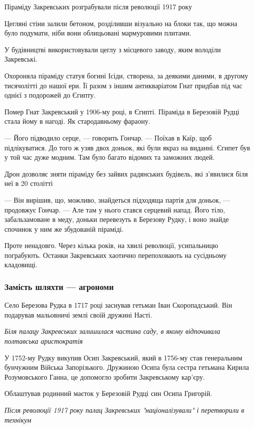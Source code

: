 Піраміду Закревських розграбували після революції 1917 року

Цегляні стіни залили бетоном, розділивши візуально на блоки так, що можна було
подумати, ніби вони облицьовані мармуровими плитами.

У будівництві використовували цеглу з місцевого заводу, яким володіли
Закревські.

Охороняла піраміду статуя богині Ісіди, створена, за деякими даними, в другому
тисячолітті до нашої ери. Її разом з іншим антикваріатом Гнат придбав під час
однієї з подорожей до Єгипту.

Помер Гнат Закревський у 1906-му році, в Єгипті. Піраміда в Березовій Рудці
стала йому в нагоді. Як стародавньому фараону.  

--- Його підводило серце, --- говорить Гончар. --- Поїхав в Каїр, щоб підлікуватися.
До того ж узяв двох доньок, які були якраз на виданні. Єгипет був у той час
дуже модним. Там було багато відомих та заможних людей. 

Дрон дозволяє зняти піраміду без зайвих радянських будівель, які з'явилися біля
неї в 20 столітті

---  Він вирішив, що, можливо, знайдеться підходяща партія для доньок, ---
продовжує Гончар. ---  Але там у нього стався серцевий напад. Його тіло,
забальзамоване в меду, доньки перевезуть в Березову Рудку, і воно знайде
спочинок у ним же збудованій піраміді.

Проте ненадовго. Через кілька років, на хвилі революції, усипальницю
пограбують. Останки Закревських хаотично перепоховають на сусідньому кладовищі.

\subsubsection{Замість шляхти --- агрономи}

Село Березова Рудка в 1717 році заснував гетьман Іван Скоропадський. Він
подарував мальовничі землі своїй дружині Насті.

\emph{Біля палацу Закревських залишилася частина саду, в якому відпочивала полтавська
аристократія}

У 1752-му Рудку викупив Осип Закревський, який в 1756-му став генеральним
бунчужним Війська Запорізького. Дружиною Осипа була сестра гетьмана Кирила
Розумовського Ганна, це допомогло зробити Закревському кар'єру.

Облаштував родинний маєток у Березовій Рудці син Осипа Григорій.

\emph{Після революції 1917 року палац Закревських "націоналізували" і перетворили в технікум}

